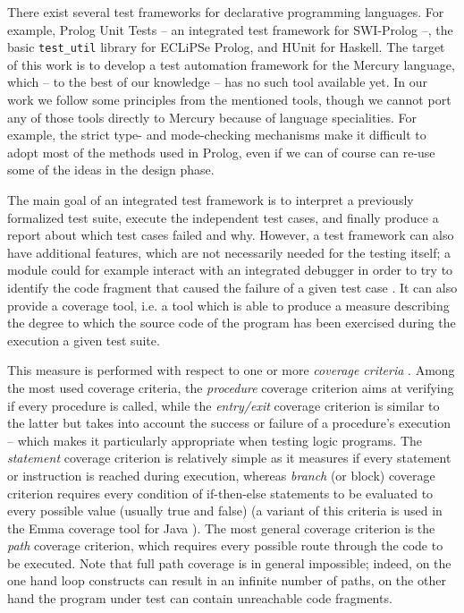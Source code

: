 \documentclass[british]{llncs}
\begin{document}
There exist several test frameworks for declarative programming languages.
For example, Prolog Unit Tests \cite{SWI:module_test} -- an integrated
test framework for SWI-Prolog --, the basic \texttt{test\_util} library
for ECLiPSe Prolog, and HUnit \cite{Haskell:HUnit} for Haskell. The
target of this work is to develop a test automation framework for
the Mercury language, which -- to the best of our knowledge -- has
no such tool available yet. In our work we follow some principles
from the mentioned tools, though we cannot port any of those tools
directly to Mercury because of language specialities. For example, the strict type- and mode-checking
mechanisms make it difficult to adopt most of the methods used in
Prolog, even if we can of course can re-use some of the ideas in the design phase.



The main goal of an integrated test framework is to interpret a previously
formalized test suite, execute the independent test cases, and finally
produce a report about which test cases failed and why. 
However, a test framework can also have additional
features, which are not necessarily needed for the testing itself;
a module could for example interact with an integrated debugger in
order to try to identify the code fragment that caused the failure
of a given test case \cite{55841}.
It can also provide a coverage tool, i.e. a tool which
is able to produce a measure describing the degree to which the source
code of the program has been exercised during the execution a given
test suite.

This measure is performed with respect to one or more \emph{coverage
criteria} \cite{zhu:coverage}. Among the most used coverage criteria,
the \emph{procedure} coverage criterion aims at verifying if every
procedure is called, while the \emph{entry/exit} coverage criterion
is similar to the latter but takes into account the success or failure
of a procedure's execution -- which makes it particularly appropriate
when testing logic programs. The \emph{statement} coverage \cite{winko:Myers2004} criterion
is relatively simple as it measures if every statement or instruction
is reached during execution, whereas \emph{branch} (or block) coverage
criterion requires every condition of if-then-else statements to be
evaluated to every possible value (usually true and false) (a variant
of this criteria is used in the Emma coverage tool for Java \cite{Emma:reference_manual}).
The most general coverage criterion is the \emph{path} coverage criterion,
which requires every possible route through the code to be executed.
Note that full path coverage is in general impossible; indeed, on
the one hand loop constructs can result in an infinite number of paths,
on the other hand the program under test can contain unreachable code
fragments.
\end{document}
